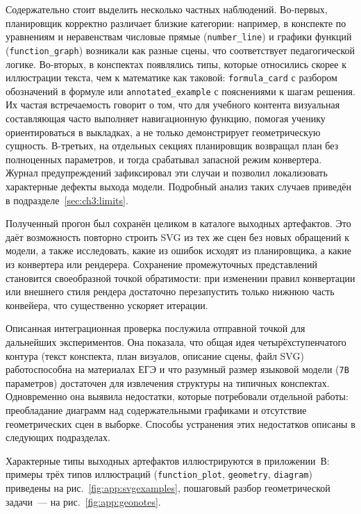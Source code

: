 Содержательно стоит выделить несколько частных наблюдений. Во-первых, планировщик корректно различает близкие категории: например, в конспекте по уравнениям и неравенствам числовые прямые (\texttt{number\_line}) и графики функций (\texttt{function\_graph}) возникали как разные сцены, что соответствует педагогической логике. Во-вторых, в конспектах появлялись типы, которые относились скорее к иллюстрации текста, чем к математике как таковой: \texttt{formula\_card} с разбором обозначений в формуле или \texttt{annotated\_example} с пояснениями к шагам решения. Их частая встречаемость говорит о том, что для учебного контента визуальная составляющая часто выполняет навигационную функцию, помогая ученику ориентироваться в выкладках, а не только демонстрирует геометрическую сущность. В-третьих, на отдельных секциях планировщик возвращал план без полноценных параметров, и тогда срабатывал запасной режим конвертера. Журнал предупреждений зафиксировал эти случаи и позволил локализовать характерные дефекты выхода модели. Подробный анализ таких случаев приведён в подразделе~\ref{sec:ch3:limits}.

Полученный прогон был сохранён целиком в каталоге выходных артефактов. Это даёт возможность повторно строить SVG из тех же сцен без новых обращений к модели, а также исследовать, какие из ошибок исходят из планировщика, а какие из конвертера или рендерера. Сохранение промежуточных представлений становится своеобразной точкой обратимости: при изменении правил конвертации или внешнего стиля рендера достаточно перезапустить только нижнюю часть конвейера, что существенно ускоряет итерации.

Описанная интеграционная проверка послужила отправной точкой для дальнейших экспериментов. Она показала, что общая идея четырёхступенчатого контура (текст конспекта, план визуалов, описание сцены, файл SVG) работоспособна на материалах ЕГЭ и что разумный размер языковой модели (\texttt{7B} параметров) достаточен для извлечения структуры на типичных конспектах. Одновременно она выявила недостатки, которые потребовали отдельной работы: преобладание диаграмм над содержательными графиками и отсутствие геометрических сцен в выборке. Способы устранения этих недостатков описаны в следующих подразделах.

Характерные типы выходных артефактов иллюстрируются в приложении~В: примеры трёх типов иллюстраций (\texttt{function\_plot}, \texttt{geometry}, \texttt{diagram}) приведены на рис.~\ref{fig:app:svgexamples}, пошаговый разбор геометрической задачи~--- на рис.~\ref{fig:app:geonotes}.

